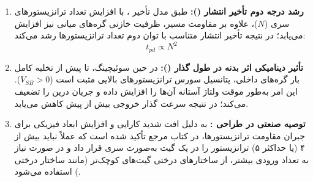 \begin{enumerate}
\item \textbf{رشد درجه دوم تأخیر انتشار ():}
طبق مدل تأخیر ، با افزایش تعداد ترانزیستورهای سری (\(N\))، علاوه بر مقاومت مسیر، ظرفیت خازنی گره‌های میانی نیز افزایش می‌یابد؛ در نتیجه تأخیر انتشار متناسب با توان دوم تعداد ترانزیستورها رشد می‌کند:
\[t_{pd} \propto N^2\]

\item \textbf{تأثیر دینامیکی اثر بدنه در طول گذار ():}
در حین سوئیچینگ، تا پیش از تخلیه کامل بار گره‌های داخلی، پتانسیل سورس ترانزیستورهای بالایی مثبت است (\(V_{SB} > 0\)). این امر به‌طور موقت ولتاژ آستانه آن‌ها را افزایش داده و جریان درین را تضعیف می‌کند؛ در نتیجه سرعت گذار خروجی بیش از پیش کاهش می‌یابد.

\item \textbf{توصیه صنعتی در طراحی :}
به دلیل افت شدید کارایی و افزایش ابعاد فیزیکی برای جبران مقاومت ترانزیستورها، در کتاب مرجع تأکید شده است که عملاً نباید بیش از ۴ (یا حداکثر ۵) ترانزیستور را در یک گیت به‌صورت سری قرار داد و در صورت نیاز به تعداد ورودی بیشتر، از ساختارهای درختی گیت‌های کوچک‌تر (مانند ساختار درختی ) استفاده می‌شود.

\end{enumerate}
